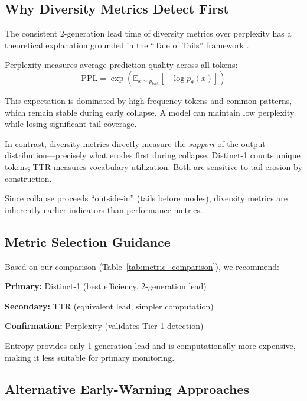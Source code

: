 \documentclass[conference]{IEEEtran}
\begin{document}
\subsection{Why Diversity Metrics Detect First}

The consistent 2-generation lead time of diversity metrics over perplexity has a theoretical explanation grounded in the ``Tale of Tails'' framework \cite{dohmatob2025strong}.

Perplexity measures average prediction quality across all tokens:
\begin{equation}
\text{PPL} = \exp\left(\mathbb{E}_{x \sim p_{\text{test}}}[-\log p_\theta(x)]\right)
\end{equation}

This expectation is dominated by high-frequency tokens and common patterns, which remain stable during early collapse. A model can maintain low perplexity while losing significant tail coverage.

In contrast, diversity metrics directly measure the \textit{support} of the output distribution---precisely what erodes first during collapse. Distinct-1 counts unique tokens; TTR measures vocabulary utilization. Both are sensitive to tail erosion by construction.

Since collapse proceeds ``outside-in'' (tails before modes), diversity metrics are inherently earlier indicators than performance metrics.

\subsection{Metric Selection Guidance}

Based on our comparison (Table~\ref{tab:metric_comparison}), we recommend:

\textbf{Primary:} Distinct-1 (best efficiency, 2-generation lead)

\textbf{Secondary:} TTR (equivalent lead, simpler computation)

\textbf{Confirmation:} Perplexity (validates Tier 1 detection)

Entropy provides only 1-generation lead and is computationally more expensive, making it less suitable for primary monitoring.

\subsection{Alternative Early-Warning Approaches}
\label{sec:alternatives}
\end{document}
